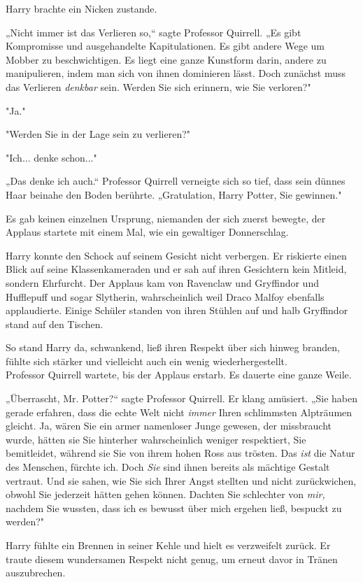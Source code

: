 {Harry brachte ein Nicken zustande.

„Nicht immer ist das Verlieren so,“ sagte Professor Quirrell. „Es gibt Kompromisse und ausgehandelte Kapitulationen. Es gibt andere Wege um Mobber zu beschwichtigen. Es liegt eine ganze Kunstform darin, andere zu manipulieren, indem man sich von ihnen dominieren lässt. Doch zunächst muss das Verlieren \emph{denkbar} sein. Werden Sie sich erinnern, wie Sie verloren?"

"Ja."

"Werden Sie in der Lage sein zu verlieren?"

"Ich... denke schon..."

„Das denke ich auch.“ Professor Quirrell verneigte sich so tief, dass sein dünnes Haar beinahe den Boden berührte. „Gratulation, Harry Potter, Sie gewinnen."

Es gab keinen einzelnen Ursprung, niemanden der sich zuerst bewegte, der Applaus startete mit einem Mal, wie ein gewaltiger Donnerschlag.

Harry konnte den Schock auf seinem Gesicht nicht verbergen. Er riskierte einen Blick auf seine Klassenkameraden und er sah auf ihren Gesichtern kein Mitleid, sondern Ehrfurcht. Der Applaus kam von Ravenclaw und Gryffindor und Hufflepuff und sogar Slytherin, wahrscheinlich weil Draco Malfoy ebenfalls applaudierte. Einige Schüler standen von ihren Stühlen auf und halb Gryffindor stand auf den Tischen.

So stand Harry da, schwankend, ließ ihren Respekt über sich hinweg branden, fühlte sich stärker und vielleicht auch ein wenig wiederhergestellt.\\ Professor Quirrell wartete, bis der Applaus erstarb. Es dauerte eine ganze Weile.

„Überrascht, Mr. Potter?“ sagte Professor Quirrell. Er klang amüsiert. „Sie haben gerade erfahren, dass die echte Welt nicht \emph{immer} Ihren schlimmsten Alpträumen gleicht. Ja, wären Sie ein armer namenloser Junge gewesen, der missbraucht wurde, hätten sie Sie hinterher wahrscheinlich weniger respektiert, Sie bemitleidet, während sie Sie von ihrem hohen Ross aus trösten. Das \emph{ist} die Natur des Menschen, fürchte ich. Doch \emph{Sie} sind ihnen bereits als mächtige Gestalt vertraut. Und sie sahen, wie Sie sich Ihrer Angst stellten und nicht zurückwichen, obwohl Sie jederzeit hätten gehen können. Dachten Sie schlechter von \emph{mir,} nachdem Sie wussten, dass ich es bewusst über mich ergehen ließ, bespuckt zu werden?"

Harry fühlte ein Brennen in seiner Kehle und hielt es verzweifelt zurück. Er traute diesem wundersamen Respekt nicht genug, um erneut davor in Tränen auszubrechen.

}
